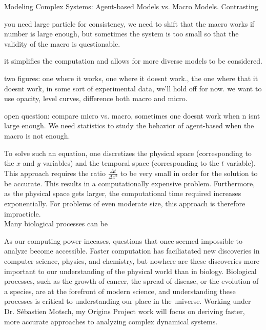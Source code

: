 \documentclass[8 pt, leqno]{article}
\begin{document}
Modeling Complex Systems: Agent-based Models vs. Macro Models.
Contrasting 


you need large particle for consistency, we need to shift that the 
macro works if number is large enough, but sometimes the system is too small  so that the validity of the macro is questionable.  

it simplifies the computation and allows for more diverse models to be considered. 




two figures: one where it works, one where it doesnt work., the one where that it doesnt work, in some sort of experimental data, we'll hold off for now. we want to use opacity, level curves, difference both macro and micro. 

open question: compare micro vs. macro, sometimes one doesnt work when n isnt large enough. We need statistics to study the behavior of agent-based when the macro is not enough.  







To solve such an equation, one discretizes the physical space (corresponding to the $x$ and $y$ variables) and the temporal space (corresponding to the $t$ variable). This approach requires the ratio $\frac{\Delta t}{\Delta x^2}$ to be very small in order for the solution to be accurate. This results in a computationally expensive problem. Furthermore, as the physical space gets larger, the computational time required increases exponentially. For problems of even moderate size, this approach is therefore impracticle.\\ 


Many biological processes can be 

As our computing power inceases, questions that once seemed impossible to analyze become accessible. Faster computation has faciliatated new discoveries in computer science, physics, and chemistry, but nowhere are these discoveries more important to our understanding of the physical world than in biology. Biological processes, such as the growth of cancer, the spread of disease, or the evolution of a species, are at the forefront of modern science, and understanding these processes is critical to understanding our place in the universe. Working under Dr. S\'{e}bastien Motsch, my Origins Project work will focus on deriving faster, more accurate approaches to analyzing complex dynamical systems.
\end{document}
